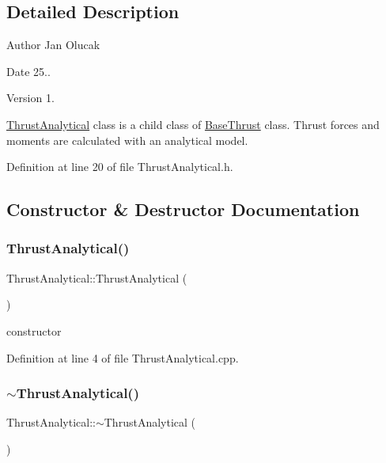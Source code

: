 \subsection{Detailed Description}
\begin{DoxyAuthor}{Author}
Jan Olucak 
\end{DoxyAuthor}
\begin{DoxyDate}{Date}
25.. 
\end{DoxyDate}
\begin{DoxyVersion}{Version}
1.
\end{DoxyVersion}
\hyperlink{class_thrust_analytical}{Thrust\+Analytical} class is a child class of \hyperlink{class_base_thrust}{Base\+Thrust} class. Thrust forces and moments are calculated with an analytical model. 

Definition at line 20 of file Thrust\+Analytical.\+h.



\subsection{Constructor \& Destructor Documentation}
\mbox{\label{class_thrust_analytical_a5c75949a22871e861090560adb2d5f18}} 
\subsubsection{\texorpdfstring{Thrust\+Analytical()}{ThrustAnalytical()}}
{\footnotesize\ttfamily Thrust\+Analytical\+::\+Thrust\+Analytical (\begin{DoxyParamCaption}{ }\end{DoxyParamCaption})}



constructor 



Definition at line 4 of file Thrust\+Analytical.\+cpp.

\mbox{\label{class_thrust_analytical_aeaf9dd69c10812c673d6cfae0d7ca4fd}} 
\subsubsection{\texorpdfstring{$\sim$\+Thrust\+Analytical()}{~ThrustAnalytical()}}
{\footnotesize\ttfamily Thrust\+Analytical\+::$\sim$\+Thrust\+Analytical (\begin{DoxyParamCaption}{ }\end{DoxyParamCaption})}



